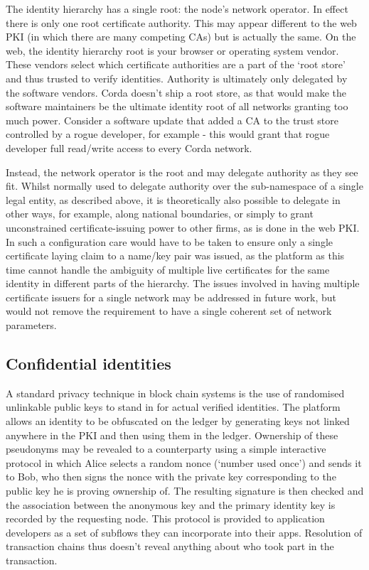 \documentclass{article}
\begin{document}
The identity hierarchy has a single root: the node's network operator. In effect there is only one root certificate
authority. This may appear different to the web PKI (in which there are many competing CAs) but is actually the
same. On the web, the identity hierarchy root is your browser or operating system vendor. These vendors select which
certificate authorities are a part of the `root store' and thus trusted to verify identities. Authority is ultimately
only delegated by the software vendors. Corda doesn't ship a root store, as that would make the software maintainers
be the ultimate identity root of all networks granting too much power. Consider a software update that added a CA
to the trust store controlled by a rogue developer, for example - this would grant that rogue developer full read/write
access to every Corda network.

Instead, the network operator is the root and may delegate authority as they see fit. Whilst normally used to
delegate authority over the sub-namespace of a single legal entity, as described above, it is theoretically also
possible to delegate in other ways, for example, along national boundaries, or simply to grant unconstrained
certificate-issuing power to other firms, as is done in the web PKI. In such a configuration care would have to be
taken to ensure only a single certificate laying claim to a name/key pair was issued, as the platform as this time
cannot handle the ambiguity of multiple live certificates for the same identity in different parts of the
hierarchy. The issues involved in having multiple certificate issuers for a single network may be addressed in
future work, but would not remove the requirement to have a single coherent set of network parameters.

\subsection{Confidential identities}\label{subsec:confidential-identities}

A standard privacy technique in block chain systems is the use of randomised unlinkable public keys to stand in for
actual verified identities. The platform allows an identity to be obfuscated on the ledger by generating keys not
linked anywhere in the PKI and then using them in the ledger. Ownership of these pseudonyms may be revealed to a
counterparty using a simple interactive protocol in which Alice selects a random nonce (`number used once') and
sends it to Bob, who then signs the nonce with the private key corresponding to the public key he is proving
ownership of. The resulting signature is then checked and the association between the anonymous key and the primary
identity key is recorded by the requesting node. This protocol is provided to application developers as a set of
subflows they can incorporate into their apps. Resolution of transaction chains thus doesn't reveal anything about
who took part in the transaction.
\end{document}
